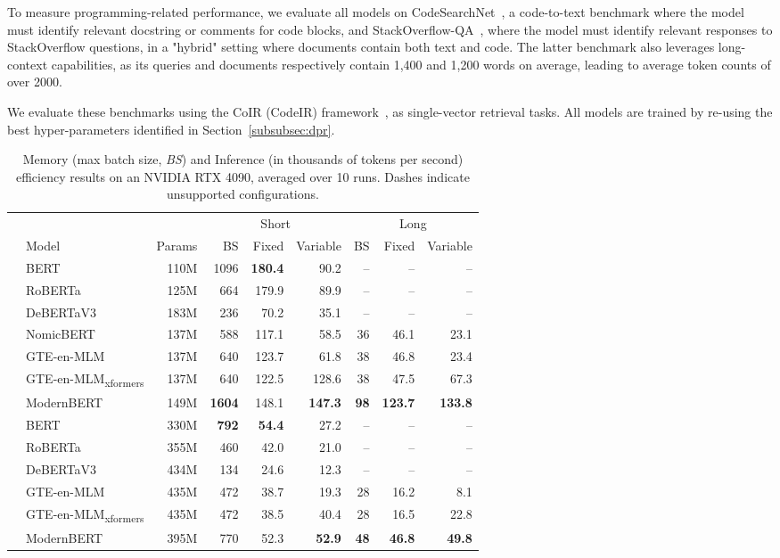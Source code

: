 \documentclass[11pt]{article}
\begin{document}
To measure programming-related performance, we evaluate all models on CodeSearchNet~\cite{codesearchnet}, a code-to-text benchmark where the model must identify relevant docstring or comments for code blocks, and StackOverflow-QA~\cite{coir}, where the model must identify relevant responses to StackOverflow questions, in a "hybrid" setting where documents contain both text and code. The latter benchmark also leverages long-context capabilities, as its queries and documents respectively contain 1,400 and 1,200 words on average, leading to average token counts of over 2000.

We evaluate these benchmarks using the CoIR (CodeIR) framework~\cite{coir}, as single-vector retrieval tasks. All models are trained by re-using the best hyper-parameters identified in Section~\ref{subsubsec:dpr}.

\begin{table*}[!t]
\centering
\begin{tabular}{llrrrrrrr}
\toprule
& & & \multicolumn{3}{c}{Short} & \multicolumn{3}{c}{Long} \\
\cmidrule(lr){4-6} \cmidrule(lr){7-9}
& Model & Params & BS & Fixed & Variable & BS & Fixed & Variable \\
\midrule
\parbox[t]{3mm}{}
& BERT & 110M & 1096 & \textbf{180.4} & 90.2 & -- & -- & -- \\
& RoBERTa & 125M & 664 & 179.9 & 89.9 & -- & -- & -- \\
& DeBERTaV3 & 183M & 236 & 70.2 & 35.1 & -- & -- & -- \\
& NomicBERT & 137M & 588 & 117.1 & 58.5 & 36 & 46.1 & 23.1 \\
& GTE-en-MLM & 137M & 640 & 123.7 & 61.8 & 38 & 46.8 & 23.4 \\
& GTE-en-MLM\textsubscript{xformers} & 137M & 640 & 122.5 & 128.6 & 38 & 47.5 & 67.3 \\
& ModernBERT & 149M & \textbf{1604} & 148.1 & \textbf{147.3} & \textbf{98} & \textbf{123.7} & \textbf{133.8} \\
\midrule
\parbox[t]{3mm}{}
& BERT & 330M & \textbf{792} & \textbf{54.4} & 27.2 & -- & -- & -- \\
& RoBERTa & 355M & 460 & 42.0 & 21.0 & -- & -- & -- \\
& DeBERTaV3 & 434M & 134 & 24.6 & 12.3 & -- & -- & -- \\
& GTE-en-MLM & 435M & 472 & 38.7 & 19.3 & 28 & 16.2 & 8.1 \\
& GTE-en-MLM\textsubscript{xformers} & 435M & 472 & 38.5 & 40.4 & 28 & 16.5 & 22.8 \\
& ModernBERT & 395M & 770 & 52.3 & \textbf{52.9} & \textbf{48} & \textbf{46.8} & \textbf{49.8} \\
\bottomrule
\end{tabular}
\caption{Memory (max batch size, \textit{BS}) and Inference (in thousands of tokens per second) efficiency results  on an NVIDIA RTX 4090, averaged over 10 runs. Dashes indicate unsupported configurations.}
\label{tab:efficiency}
\end{table*}
\end{document}
